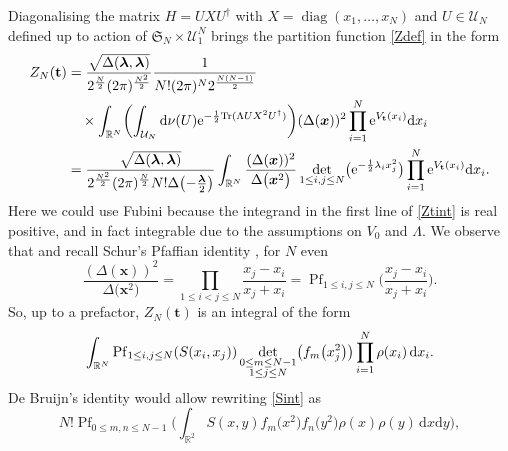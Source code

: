 \documentclass[10pt,a4paper]{amsart}
\numberwithin{equation}{section}
\newcommand{\dd}{\mathrm{d}}
\begin{document}
Diagonalising the matrix $H = UXU^{\dagger}$ with $X = \operatorname{diag}(x_1,\dots,x_N)$ and $U \in \mathcal{U}_N$ defined up to action of $\mathfrak{S}_N \times \mathcal{U}_1^{N}$ brings the partition function \eqref{Zdef} in the form
\begin{align}
Z_N(\mathbf{t}) & = \frac{\sqrt{\Delta(\boldsymbol{\lambda},\boldsymbol{\lambda})}}{2^{\frac{N}{2}} (2\pi)^{\frac{N^2}{2}}} \frac{1}{N! (2\pi)^N 2^{\frac{N(N - 1)}{2}}} \nonumber\\
&\quad{}\times \int_{\mathbb{R}^N} \biggl(\int_{\mathcal{U}_N} \dd \nu(U) {\rm e}^{-\frac{1}{2}{\rm Tr}(\Lambda U X^2 U^{\dagger})}\biggr) (\Delta(\boldsymbol{x}))^2 \prod_{i = 1}^N {\rm e}^{V_{\mathbf{t}}(x_i)}\dd x_i \nonumber \\
& = \frac{\sqrt{\Delta(\boldsymbol{\lambda},\boldsymbol{\lambda})}}{2^{\frac{N^2}{2}} (2\pi)^{\frac{N}{2}} N! \Delta\bigl(-\frac{\boldsymbol{\lambda}}{2}\bigr)} \int_{\mathbb{R}^N} \frac{(\Delta(\boldsymbol{x}))^2}{\Delta\bigl(\boldsymbol{x}^2\bigr)} \mathop{\det}_{1 \leq i,j \leq N} \bigl({\rm e}^{-\frac{1}{2}\lambda_ix_j^2}\bigr) \prod_{i = 1}^N {\rm e}^{V_{\mathbf{t}}(x_i)} \dd x_i. \label{Ztint}
\end{align}
Here we could use Fubini because the integrand in the first line of \eqref{Ztint} is real positive, and in fact integrable due to the assumptions on $V_0$ and $\Lambda$. We observe that  and recall Schur's Pfaffian identity \cite{Schur1911}, for $N$ even
\[
\frac{(\Delta(\boldsymbol{x}))^2}{\Delta\bigl(\boldsymbol{x}^2\bigr)} = \prod_{1 \leq i < j \leq N} \frac{x_j - x_i}{x_j + x_i} = \operatorname{Pf}_{1 \leq i,j \leq N}\biggl(\frac{x_j - x_i}{x_j + x_i}\biggr).
\]
So, up to a prefactor, $Z_N(\mathbf{t})$ is an integral of the form
\begin{equation}
\label{Sint}
\int_{\mathbb{R}^N} \operatorname{Pf}_{1 \leq i,j \leq N} (S(x_i,x_j)) \mathop{{\rm det}}_{\substack{0 \leq m \leq N - 1 \\ 1 \leq j \leq N}} \bigl(f_m\bigl(x_j^2\bigr)\bigr) \prod_{i = 1}^N \rho(x_i)\,\dd x_i.
\end{equation}
De Bruijn's identity \cite{deBruijn1955} would allow rewriting \eqref{Sint} as
\begin{equation}
\label{dJ}
N! \operatorname{Pf}_{0 \leq m,n \leq N - 1}\biggl(\int_{\mathbb{R}^2} S(x,y) f_m\bigl(x^2\bigr)f_n\bigl(y^2\bigr)\rho(x)\rho(y)\,\dd x \dd y\biggr),
\end{equation}
\end{document}

